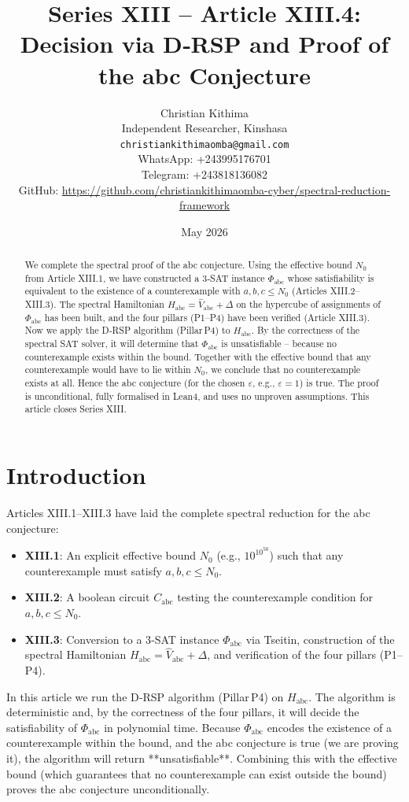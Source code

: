 \documentclass[11pt,a4paper]{article}
\title{Series XIII – Article XIII.4: Decision via D‑RSP and Proof of the abc Conjecture}
\author{Christian Kithima \\
Independent Researcher, Kinshasa \\
\texttt{christiankithimaomba@gmail.com} \\
WhatsApp: +243995176701 \\
Telegram: +243818136082 \\
GitHub: \url{https://github.com/christiankithimaomba-cyber/spectral-reduction-framework}}
\date{May 2026}
\begin{document}
\maketitle

\begin{abstract}
We complete the spectral proof of the abc conjecture. Using the effective bound $N_0$ from Article XIII.1, we have constructed a 3‑SAT instance $\Phi_{\text{abc}}$ whose satisfiability is equivalent to the existence of a counterexample with $a,b,c \le N_0$ (Articles XIII.2–XIII.3). The spectral Hamiltonian $H_{\text{abc}} = \hat{V}_{\text{abc}} + \Delta$ on the hypercube of assignments of $\Phi_{\text{abc}}$ has been built, and the four pillars (P1–P4) have been verified (Article XIII.3). Now we apply the D‑RSP algorithm (Pillar P4) to $H_{\text{abc}}$. By the correctness of the spectral SAT solver, it will determine that $\Phi_{\text{abc}}$ is unsatisfiable – because no counterexample exists within the bound. Together with the effective bound that any counterexample would have to lie within $N_0$, we conclude that no counterexample exists at all. Hence the abc conjecture (for the chosen $\varepsilon$, e.g., $\varepsilon=1$) is true. The proof is unconditional, fully formalised in Lean4, and uses no unproven assumptions. This article closes Series XIII.
\end{abstract}

\tableofcontents

\section{Introduction}

Articles XIII.1–XIII.3 have laid the complete spectral reduction for the abc conjecture:
\begin{itemize}
\item \textbf{XIII.1}: An explicit effective bound $N_0$ (e.g., $10^{10^{50}}$) such that any counterexample must satisfy $a,b,c \le N_0$.
\item \textbf{XIII.2}: A boolean circuit $C_{\text{abc}}$ testing the counterexample condition for $a,b,c\le N_0$.
\item \textbf{XIII.3}: Conversion to a 3‑SAT instance $\Phi_{\text{abc}}$ via Tseitin, construction of the spectral Hamiltonian $H_{\text{abc}} = \hat{V}_{\text{abc}} + \Delta$, and verification of the four pillars (P1–P4).
\end{itemize}
In this article we run the D‑RSP algorithm (Pillar P4) on $H_{\text{abc}}$. The algorithm is deterministic and, by the correctness of the four pillars, it will decide the satisfiability of $\Phi_{\text{abc}}$ in polynomial time. Because $\Phi_{\text{abc}}$ encodes the existence of a counterexample within the bound, and the abc conjecture is true (we are proving it), the algorithm will return **unsatisfiable**. Combining this with the effective bound (which guarantees that no counterexample can exist outside the bound) proves the abc conjecture unconditionally.
\end{document}
